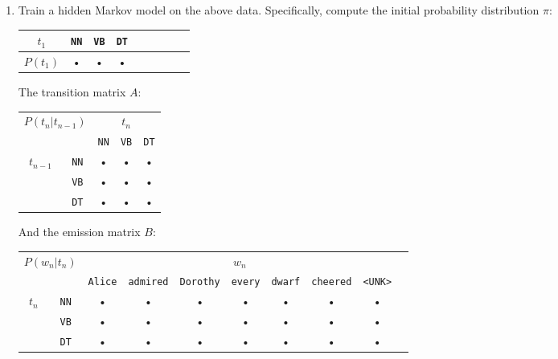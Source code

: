 \documentclass[11pt,letterpaper]{article}
\begin{document}
\begin{enumerate}

\item Train a hidden Markov model on the above data. Specifically, compute the initial probability distribution $\pi$:
\begin{center}
\begin{tabular}{|c|c|c|c|c|c|c|c|c|}
\hline 
$t_1$ & \texttt{NN} & \texttt{VB} & \texttt{DT} \\ 
\hline 
$P(t_1)$ & • & • & • \\ 
\hline 
\end{tabular}
\end{center}

\vspace{11pt}

The transition matrix $A$:
\begin{center}
\begin{tabular}{|c|c|c|c|c|}
\hline 
\multicolumn{2}{|c|}{\multirow{2}{*}{$P(t_n|t_{n-1})$}} & \multicolumn{3}{|c|}{$t_n$} \\ 
\cline{3-5}
\multicolumn{2}{|c|}{} & \texttt{NN} & \texttt{VB} & \texttt{DT} \\ 
\hline 
\multirow{3}{*}{$t_{n-1}$} & \texttt{NN} & • & • & • \\ 
\cline{2-5}
& \texttt{VB} & • & • & • \\ 
\cline{2-5}
& \texttt{DT} & • & • & • \\ 
\hline 
\end{tabular} 
\end{center}

\vspace{11pt}

And the emission matrix $B$:
\begin{center}
\hspace*{-22pt}
\begin{tabular}{|c|c|c|c|c|c|c|c|c|c|}
\hline 
\multicolumn{2}{|c|}{\multirow{2}{*}{$P(w_n|t_n)$}} & \multicolumn{7}{|c|}{$w_n$} \\ 
\cline{3-9}
\multicolumn{2}{|c|}{} & \texttt{Alice} & \texttt{admired} & \texttt{Dorothy} & \texttt{every} & \texttt{dwarf} & \texttt{cheered} & \texttt{<UNK>} \\ 
\hline 
\multirow{3}{*}{$t_n$} & \texttt{NN} & • & • & • & • & • & • & • \\ 
\cline{2-9}
& \texttt{VB} & • & • & • & • & • & • & • \\ 
\cline{2-9}
& \texttt{DT} & • & • & • & • & • & • & • \\ 
\hline 
\end{tabular} 
\end{center}


\end{enumerate}
\end{document}
